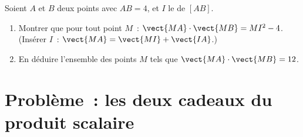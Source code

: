 \begin{exercise}[$\star\star\star$]\label{exo:g11:scal:11}
Soient $A$ et $B$ deux points avec $AB = 4$, et $I$ le  de
$[AB]$.
\begin{enumerate}
  \item Montrer que pour tout point $M$~:
        $\vect{MA}\cdot\vect{MB} = MI^2 - 4$.
        (Insérer $I$~: $\vect{MA} = \vect{MI} + \vect{IA}$.)
  \item En déduire l'ensemble des points $M$ tels que
        $\vect{MA}\cdot\vect{MB} = 12$.
\end{enumerate}
\end{exercise}

\section{Problème~: les deux cadeaux du produit scalaire}

